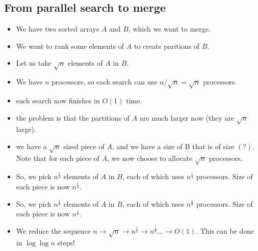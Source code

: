 \subsection{From parallel search to merge}
\begin{itemize}
    \item We have two sorted arrays $A$ and $B$, which we want to merge.
    \item We want to rank some elements of $A$ to create paritions of $B$.
    \item Let us take $\sqrt n$ elements of $A$ in $B$.
    \item We have $n$ processors, so each search can use $ n / \sqrt n = \sqrt n$ processors.
    \item each search now finishes in $O(1)$  time.
    \item the problem is that the partitions of $A$ are much larger now (they are $\sqrt n$ large).
    \item we have a $\sqrt n$ sized piece of $A$, and we have a size of B that is of size $(?)$.
        Note that for each piece of $A$, we now choose to allocate $\sqrt n$ processors.
    \item So, we pick $n^\frac{1}{4}$ elements of $A$ in $B$, each of which
        uses $n^\frac{1}{4}$ processors. Size of each piece is now $n^\frac{1}{4}$.
    \item So, we pick $n^\frac{1}{8}$ elements of $A$ in $B$, each of which
        uses $n^\frac{1}{8}$ processors. Size of each piece is now $n^\frac{1}{8}$.
    \item We reduce the sequence $n \to \sqrt n \to n^{\frac{1}{4}} \to n^\frac{1}{8} \dots \to O(1)$.
        This can be done in $\log \log n$ steps!
\end{itemize}
